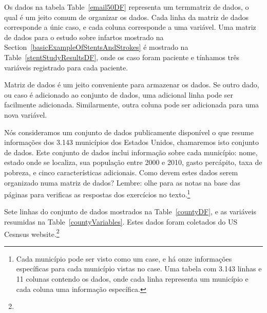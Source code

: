 
Os dados na tabela Table~\ref{email50DF} representa um term{matriz de dados}, o qual é um jeito comum de organizar os dados. Cada linha da matriz de dados corresponde a únic caso, e cada coluna corresponde a uma variável. Uma matriz de dados para o estudo sobre infartos mostrado na Section~\ref{basicExampleOfStentsAndStrokes} é mostrado na Table~\vref{stentStudyResultsDF}, onde os caso foram paciente e tínhamos três variáveis registrado para cada paciente.

Matriz de dados é um jeito conveniente para armazenar os dados. Se outro dado, ou caso é adicionado ao conjunto de dados, uma adicional linha pode ser facilmente adicionada. Similarmente, outra coluna pode ser adicionada para uma nova variável.


\begin{exercise}
    Nós consideramos um conjunto de dados publicamente disponível o que resume informações dos 3.143 municípios dos Estados Unidos, chamaremos isto  conjunto de dados. Este conjunto de dados inclui informação sobre cada município: nome, estado onde se localiza, sua população entre 2000 e 2010, gasto percápito, taxa de pobreza, e cinco características adicionais. Como devem estes dados serem organizado numa matriz de dados? Lembre: olhe para as notas na base das páginas para verificas as respostas dos exercícios no texto.\footnote{Cada município pode ser visto como um case, e há onze informações específicas para cada município vistas no case. Uma tabela com 3.143 linhas e 11 colunas contendo os dados, onde cada linha representa um município e cada coluna uma informação específica.}
\end{exercise}

\noindent Sete linhas do  conjunto de dados mostrados na Table~\ref{countyDF}, e as variáveis resumidas na Table~\ref{countyVariables}. Estes dados foram coletados do US Cesnsus website.\footnote{}

